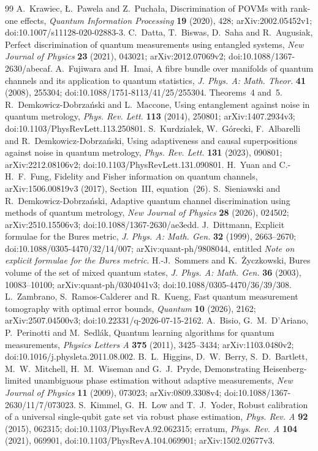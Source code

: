 \begin{thebibliography}{99}
 A.~Krawiec, \L.~Pawela and Z.~Pucha\l a,
Discrimination of POVMs with rank-one effects,
\emph{Quantum Information Processing} \textbf{19} (2020), 428;
arXiv:2002.05452v1; doi:10.1007/s11128-020-02883-3.
 C.~Datta, T.~Biswas, D.~Saha and R.~Augusiak,
Perfect discrimination of quantum measurements using entangled systems,
\emph{New Journal of Physics} \textbf{23} (2021), 043021;
arXiv:2012.07069v2; doi:10.1088/1367-2630/abecaf.
 A.~Fujiwara and H.~Imai,
A fibre bundle over manifolds of quantum channels and its application
to quantum statistics,
\emph{J. Phys. A: Math. Theor.} \textbf{41} (2008), 255304;
doi:10.1088/1751-8113/41/25/255304. Theorems~4 and~5.
 R.~Demkowicz-Dobrza\'nski and L.~Maccone,
Using entanglement against noise in quantum metrology,
\emph{Phys. Rev. Lett.} \textbf{113} (2014), 250801;
arXiv:1407.2934v3; doi:10.1103/PhysRevLett.113.250801.
 S.~Kurdzia\l ek, W.~G\'orecki, F.~Albarelli
and R.~Demkowicz-Dobrza\'nski,
Using adaptiveness and causal superpositions against noise in quantum metrology,
\emph{Phys. Rev. Lett.} \textbf{131} (2023), 090801;
arXiv:2212.08106v2; doi:10.1103/PhysRevLett.131.090801.
 H.~Yuan and C.-H.~F.~Fung,
Fidelity and Fisher information on quantum channels,
arXiv:1506.00819v3 (2017), Section~III, equation~(26).
 S.~Sieniawski and R.~Demkowicz-Dobrza\'nski,
Adaptive quantum channel discrimination using methods of quantum metrology,
\emph{New Journal of Physics} \textbf{28} (2026), 024502;
arXiv:2510.15506v3; doi:10.1088/1367-2630/ae3edd.
 J.~Dittmann,
Explicit formulae for the Bures metric,
\emph{J. Phys. A: Math. Gen.} \textbf{32} (1999), 2663--2670;
doi:10.1088/0305-4470/32/14/007;
arXiv:quant-ph/9808044, entitled
\emph{Note on explicit formulae for the Bures metric}.
 H.-J.~Sommers and K.~\.{Z}yczkowski,
Bures volume of the set of mixed quantum states,
\emph{J. Phys. A: Math. Gen.} \textbf{36} (2003), 10083--10100;
arXiv:quant-ph/0304041v3; doi:10.1088/0305-4470/36/39/308.
 L.~Zambrano, S.~Ramos-Calderer and R.~Kueng,
Fast quantum measurement tomography with optimal error bounds,
\emph{Quantum} \textbf{10} (2026), 2162;
arXiv:2507.04500v3; doi:10.22331/q-2026-07-15-2162.
 A.~Bisio, G.~M.~D'Ariano, P.~Perinotti and M.~Sedl\'ak,
Quantum learning algorithms for quantum measurements,
\emph{Physics Letters A} \textbf{375} (2011), 3425--3434;
arXiv:1103.0480v2; doi:10.1016/j.physleta.2011.08.002.
 B.~L.~Higgins, D.~W.~Berry, S.~D.~Bartlett,
M.~W.~Mitchell, H.~M.~Wiseman and G.~J.~Pryde,
Demonstrating Heisenberg-limited unambiguous phase estimation
without adaptive measurements,
\emph{New Journal of Physics} \textbf{11} (2009), 073023;
arXiv:0809.3308v4; doi:10.1088/1367-2630/11/7/073023.
 S.~Kimmel, G.~H.~Low and T.~J.~Yoder,
Robust calibration of a universal single-qubit gate set via robust phase estimation,
\emph{Phys. Rev. A} \textbf{92} (2015), 062315;
doi:10.1103/PhysRevA.92.062315;
erratum, \emph{Phys. Rev. A} \textbf{104} (2021), 069901,
doi:10.1103/PhysRevA.104.069901; arXiv:1502.02677v3.


\end{thebibliography}
